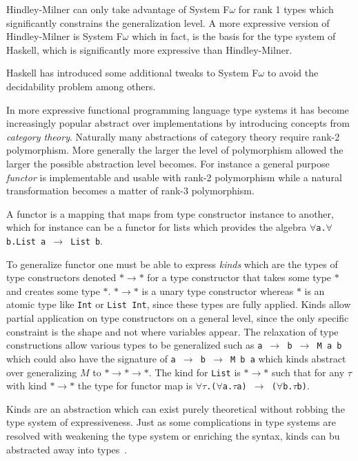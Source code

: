 Hindley-Milner can only take advantage of System F\underline{$\omega$} for rank 1 types which significantly constrains the generalization level.
A more expressive version of Hindley-Milner is System F$\omega$ which in fact, is the basis for the type system of Haskell, which is significantly more expressive than Hindley-Milner.
\begin{remark}
    Haskell has introduced some additional tweaks to System F$\omega$ to avoid the decidability problem among others.
\end{remark}

In more expressive functional programming language type systems it has become increasingly popular abstract over implementations by introducing concepts from \textit{category theory}.
Naturally many abstractions of category theory require rank-2 polymorphism.
More generally the larger the level of polymorphism allowed the larger the possible abstraction level becomes.
For instance a general purpose \textit{functor} is implementable and usable with rank-2 polymorphism while a natural transformation becomes a matter of rank-3 polymorphism.
\begin{remark}
    A functor is a mapping that maps from type constructor instance to another, which for instance can be a functor for lists which provides the algebra \texttt{$\forall$a.$\forall$b.List a $\rightarrow$ List b}.
\end{remark}
\noindent To generalize functor one must be able to express \textit{kinds} which are the types of type constructors denoted $* \rightarrow *$ for a type constructor that takes some type $*$ and creates some type $*$.
$* \rightarrow *$ is a unary type constructor whereas $*$ is an atomic type like \texttt{Int} or \texttt{List Int}, since these types are fully applied.
Kinds allow partial application on type constructors on a general level, since the only specific constraint is the shape and not where variables appear.
The relaxation of type constructions allow various types to be generalized such as \texttt{a $\rightarrow$ b $\rightarrow$ M a b} which could also have the signature of \texttt{a $\rightarrow$ b $\rightarrow$ M b a} which kinds abstract over generalizing $M$ to $* \rightarrow * \rightarrow *$.
The kind for \texttt{List} is $* \rightarrow *$ such that for any $\tau$ with kind $* \rightarrow *$ the type for functor map is \texttt{$\forall\tau$.($\forall$a.$\tau$a) $\rightarrow$ ($\forall$b.$\tau$b)}.
\begin{remark}
    Kinds are an abstraction which can exist purely theoretical without robbing the type system of expressiveness.
    Just as some complications in type systems are resolved with weakening the type system or enriching the syntax, kinds can bu abstracted away into types~\cite{weirich2013system}.
\end{remark}

